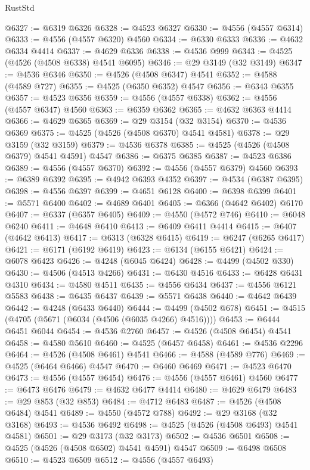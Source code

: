 \begin{lexlean}{RustStd}
\begin{coremodule}
@6327 := @6319 @6326
@6328 := @4523 @6327
@6330 := @4556 (@4557 @6314)
@6333 := @4556 (@4557 @6320) @4560
@6334 := @6330 @6333
@6336 := @4632 @6334 @4414
@6337 := @4629 @6336
@6338 := @4536 @999
@6343 := @4525 (@4526 (@4508 @6338) @4541 @6095)
@6346 := @29 @3149 (@32 @3149)
@6347 := @4536 @6346
@6350 := @4526 (@4508 @6347) @4541
@6352 := @4588 (@4589 @727)
@6355 := @4525 (@6350 @6352) @4547
@6356 := @6343 @6355
@6357 := @4523 @6356
@6359 := @4556 (@4557 @6338)
@6362 := @4556 (@4557 @6347) @4560
@6363 := @6359 @6362
@6365 := @4632 @6363 @4414
@6366 := @4629 @6365
@6369 := @29 @3154 (@32 @3154)
@6370 := @4536 @6369
@6375 := @4525 (@4526 (@4508 @6370) @4541 @4581)
@6378 := @29 @3159 (@32 @3159)
@6379 := @4536 @6378
@6385 := @4525 (@4526 (@4508 @6379) @4541 @4591) @4547
@6386 := @6375 @6385
@6387 := @4523 @6386
@6389 := @4556 (@4557 @6370)
@6392 := @4556 (@4557 @6379) @4560
@6393 := @6389 @6392
@6395 := @4942 @6393 @4352
@6397 := @4534 (@6387 @6395)
@6398 := @4556 @6397
@6399 := @4651 @6128
@6400 := @6398 @6399
@6401 := @5571 @6400
@6402 := @4689 @6401
@6405 := @6366 (@4642 @6402) @6170
@6407 := @6337 (@6357 @6405)
@6409 := @4550 (@4572 @746)
@6410 := @6048 @6240
@6411 := @4648 @6410
@6413 := @6409 @6411 @4414
@6415 := @6407 (@4642 @6413)
@6417 := @6313 (@6328 @6415)
@6419 := @6247 (@6265 @6417)
@6421 := @6171 (@6192 @6419)
@6423 := @6134 (@6155 @6421)
@6424 := @6078 @6423
@6426 := @4248 (@6045 @6424)
@6428 := @4499 (@4502 @330)
@6430 := @4506 (@4513 @4266)
@6431 := @6430 @4516
@6433 := @6428 @6431 @4310
@6434 := @4580 @4511
@6435 := @4556 @6434
@6437 := @4556 @6121 @5583
@6438 := @6435 @6437
@6439 := @5571 @6438
@6440 := @4642 @6439
@6442 := @4248 (@6433 @6440)
@6444 := @4499 (@4502 @678)
@6451 := @4515 (@4705 (@5671 (@6034 (@4506 (@6035 @4266) @4516))))
@6453 := @6444 @6451 @6044
@6454 := @4536 @2760
@6457 := @4526 (@4508 @6454) @4541
@6458 := @4580 @5610
@6460 := @4525 (@6457 @6458)
@6461 := @4536 @2296
@6464 := @4526 (@4508 @6461) @4541
@6466 := @4588 (@4589 @776)
@6469 := @4525 (@6464 @6466) @4547
@6470 := @6460 @6469
@6471 := @4523 @6470
@6473 := @4556 (@4557 @6454)
@6476 := @4556 (@4557 @6461) @4560
@6477 := @6473 @6476
@6479 := @4632 @6477 @4414
@6480 := @4629 @6479
@6483 := @29 @853 (@32 @853)
@6484 := @4712 @6483
@6487 := @4526 (@4508 @6484) @4541
@6489 := @4550 (@4572 @788)
@6492 := @29 @3168 (@32 @3168)
@6493 := @4536 @6492
@6498 := @4525 (@4526 (@4508 @6493) @4541 @4581)
@6501 := @29 @3173 (@32 @3173)
@6502 := @4536 @6501
@6508 := @4525 (@4526 (@4508 @6502) @4541 @4591) @4547
@6509 := @6498 @6508
@6510 := @4523 @6509
@6512 := @4556 (@4557 @6493)

\end{coremodule}
\end{lexlean}
